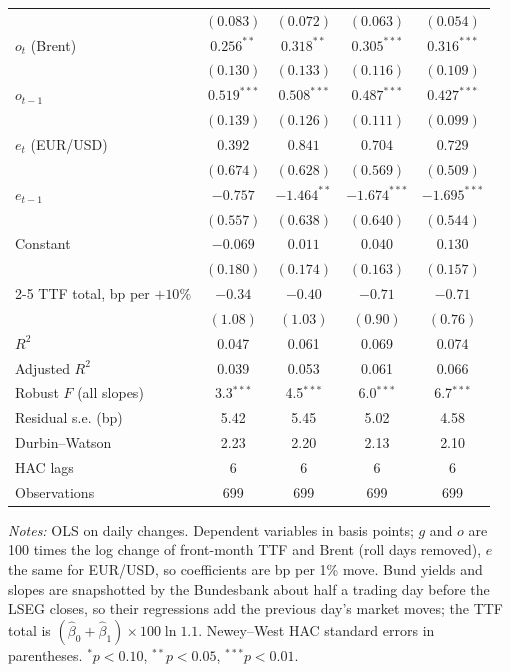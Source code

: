 \documentclass[11pt,a4paper]{article}
\begin{document}
\begin{table}[htbp]
\begin{tabular}{@{}l*{4}{c}@{}}
 & $(0.083)$ & $(0.072)$ & $(0.063)$ & $(0.054)$\\
$o_t$ (Brent) & $0.256^{**}$ & $0.318^{**}$ & $0.305^{***}$ & $0.316^{***}$\\
 & $(0.130)$ & $(0.133)$ & $(0.116)$ & $(0.109)$\\
$o_{t-1}$ & $0.519^{***}$ & $0.508^{***}$ & $0.487^{***}$ & $0.427^{***}$\\
 & $(0.139)$ & $(0.126)$ & $(0.111)$ & $(0.099)$\\
$e_t$ (EUR/USD) & $0.392$ & $0.841$ & $0.704$ & $0.729$\\
 & $(0.674)$ & $(0.628)$ & $(0.569)$ & $(0.509)$\\
$e_{t-1}$ & $-0.757$ & $-1.464^{**}$ & $-1.674^{***}$ & $-1.695^{***}$\\
 & $(0.557)$ & $(0.638)$ & $(0.640)$ & $(0.544)$\\
Constant & $-0.069$ & $0.011$ & $0.040$ & $0.130$\\
 & $(0.180)$ & $(0.174)$ & $(0.163)$ & $(0.157)$\\
\cmidrule(l){2-5}
TTF total, bp per $+10\%$ & $-0.34$ & $-0.40$ & $-0.71$ & $-0.71$\\
 & $(1.08)$ & $(1.03)$ & $(0.90)$ & $(0.76)$\\
$R^2$ & 0.047 & 0.061 & 0.069 & 0.074\\
Adjusted $R^2$ & 0.039 & 0.053 & 0.061 & 0.066\\
Robust $F$ (all slopes) & 3.3$^{***}$ & 4.5$^{***}$ & 6.0$^{***}$ & 6.7$^{***}$\\
Residual s.e. (bp) & 5.42 & 5.45 & 5.02 & 4.58\\
Durbin--Watson & 2.23 & 2.20 & 2.13 & 2.10\\
HAC lags & 6 & 6 & 6 & 6\\
Observations & 699 & 699 & 699 & 699\\
\bottomrule
\end{tabular}
\par\vspace{4pt}\begin{minipage}{0.94\textwidth}\scriptsize\textit{Notes:} OLS on daily changes. Dependent variables in basis points; $g$ and $o$ are 100 times the log change of front-month TTF and Brent (roll days removed), $e$ the same for EUR/USD, so coefficients are bp per 1\% move. Bund yields and slopes are snapshotted by the Bundesbank about half a trading day before the LSEG closes, so their regressions add the previous day's market moves; the TTF total is $(\hat\beta_0+\hat\beta_1)\times 100\ln 1.1$. Newey--West HAC standard errors in parentheses. $^{*}p<0.10$, $^{**}p<0.05$, $^{***}p<0.01$.\end{minipage}
\end{table}
\end{document}
